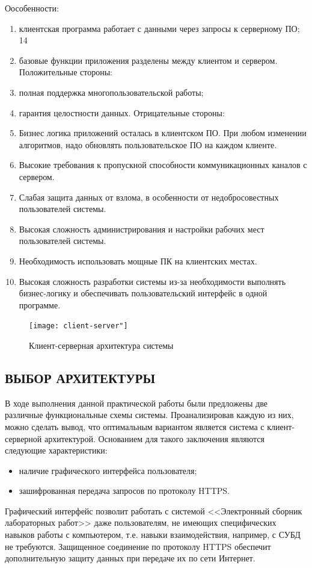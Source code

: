 \documentclass[a4paper,14pt]{extarticle}
\begin{document}
Оособенности:
\begin{enumerate}
	\item  клиентская программа работает с данными через запросы к
	серверному ПО;
	14
	\item  базовые функции приложения разделены между клиентом и
	сервером.
	Положительные стороны:
	\item  полная поддержка многопользовательской работы;
	\item  гарантия целостности данных.
	Отрицательные стороны:
	\item  Бизнес логика приложений осталась в клиентском ПО. При
	любом изменении алгоритмов, надо обновлять пользовательское
	ПО на каждом клиенте.
	\item  Высокие требования к пропускной способности
	коммуникационных каналов с сервером.
	\item  Слабая защита данных от взлома, в особенности от
	недобросовестных пользователей системы.
	\item  Высокая сложность администрирования и настройки рабочих
	мест пользователей системы.
	\item  Необходимость использовать мощные ПК на клиентских местах.
	\item  Высокая сложность разработки системы из-за необходимости
	выполнять бизнес-логику и обеспечивать пользовательский
	интерфейс в одной программе.
\end{enumerate}

\begin{figure}[h!]
	\centering
	\texttt{[image: client-server"]}
	\caption{Клиент-серверная архитектура системы}
	\label{fig:client-server}
\end{figure}

\subsection{ВЫБОР АРХИТЕКТУРЫ}

В ходе выполнения данной практической работы были предложены две различные функциональные схемы системы.
Проанализировав каждую из них, можно сделать вывод, что оптимальным вариантом является система с клиент-серверной архитектурой. Основанием для такого заключения являются следующие характеристики:
\begin{itemize}
	\item  наличие графического интерфейса пользователя;
	\item зашифрованная передача запросов по протоколу HTTPS.
\end{itemize}
Графический интерфейс позволит работать с системой <<Электронный сборник лабораторных работ>> даже пользователям, не имеющих специфических навыков работы с компьютером, т.е. навыки взаимодействия, например, с СУБД не требуются. Защищенное соединение по протоколу HTTPS обеспечит дополнительную защиту данных при передаче их по сети Интернет.
\end{document}
